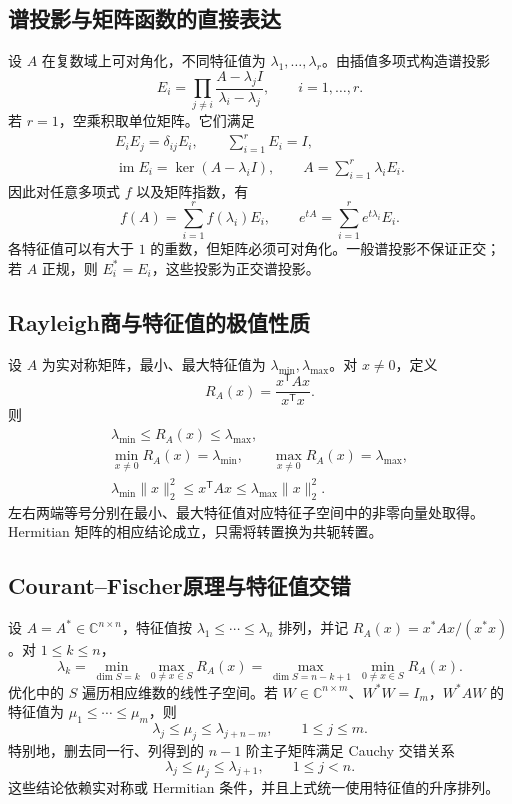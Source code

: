 \documentclass[../main.tex]{subfiles}
\begin{document}
\subsection{谱投影与矩阵函数的直接表达}
设 $A$ 在复数域上可对角化，不同特征值为 $\lambda_1,\ldots,\lambda_r$。由插值多项式构造谱投影
\[
E_i=\prod_{j\ne i}\frac{A-\lambda_jI}{\lambda_i-\lambda_j},\qquad i=1,\ldots,r.
\]
若 $r=1$，空乘积取单位矩阵。它们满足
\begin{gather*}
E_iE_j=\delta_{ij}E_i,\qquad \sum_{i=1}^rE_i=I,\\
\operatorname{im}E_i=\ker(A-\lambda_iI),\qquad
A=\sum_{i=1}^r\lambda_iE_i.
\end{gather*}
因此对任意多项式 $f$ 以及矩阵指数，有
\[
f(A)=\sum_{i=1}^rf(\lambda_i)E_i,\qquad
e^{tA}=\sum_{i=1}^re^{t\lambda_i}E_i.
\]
各特征值可以有大于 $1$ 的重数，但矩阵必须可对角化。一般谱投影不保证正交；若 $A$ 正规，则 $E_i^*=E_i$，这些投影为正交谱投影。
\par\pagebreak[0]\begin{samepage}
\subsection{Rayleigh商与特征值的极值性质}
设 $A$ 为实对称矩阵，最小、最大特征值为 $\lambda_{\min},\lambda_{\max}$。对 $x\ne0$，定义
\[
R_A(x)=\frac{x^{\mathsf T}Ax}{x^{\mathsf T}x}.
\]
则
\begin{gather*}
\lambda_{\min}\le R_A(x)\le\lambda_{\max},\\
\min_{x\ne0}R_A(x)=\lambda_{\min},\qquad
\max_{x\ne0}R_A(x)=\lambda_{\max},\\
\lambda_{\min}\|x\|_2^2\le x^{\mathsf T}Ax
\le\lambda_{\max}\|x\|_2^2.
\end{gather*}
左右两端等号分别在最小、最大特征值对应特征子空间中的非零向量处取得。
Hermitian 矩阵的相应结论成立，只需将转置换为共轭转置。
\par\end{samepage}\pagebreak[0]
\subsection{Courant--Fischer原理与特征值交错}
设 $A=A^*\in\mathbb C^{n\times n}$，特征值按 $\lambda_1\le\cdots\le\lambda_n$ 排列，并记 $R_A(x)=x^*Ax/(x^*x)$。对 $1\le k\le n$，
\[
\lambda_k
=\min_{\dim S=k}\ \max_{0\ne x\in S}R_A(x)
=\max_{\dim S=n-k+1}\ \min_{0\ne x\in S}R_A(x).
\]
优化中的 $S$ 遍历相应维数的线性子空间。若 $W\in\mathbb C^{n\times m}$、$W^*W=I_m$，$W^*AW$ 的特征值为 $\mu_1\le\cdots\le\mu_m$，则
\[
\lambda_j\le\mu_j\le\lambda_{j+n-m},\qquad 1\le j\le m.
\]
特别地，删去同一行、列得到的 $n-1$ 阶主子矩阵满足 Cauchy 交错关系
\[
\lambda_j\le\mu_j\le\lambda_{j+1},\qquad 1\le j<n.
\]
这些结论依赖实对称或 Hermitian 条件，并且上式统一使用特征值的升序排列。
\end{document}
